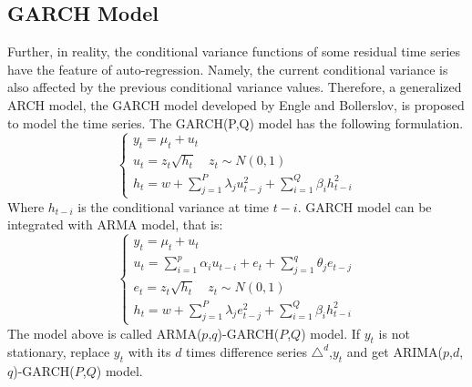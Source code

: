 \subsection{GARCH Model}
\vspace{-0.05in}
Further, in reality, the conditional variance functions of some residual time series have the feature of auto-regression. Namely, the current conditional variance is also affected by the previous conditional variance values. Therefore, a generalized ARCH model, the GARCH model developed by Engle and Bollerslov, is  proposed to model the time series. The GARCH(P,Q) model has the following formulation.
\begin{equation}
    \begin{cases}
      y_t = \mu_t + u_t \\
      u_t = z_t{\sqrt{h_t}}\quad z_t\sim N(0,1)\\
      h_t = w+\sum_{j=1}^{P} {\lambda_j{u_{t-j}^2}}+\sum_{i=1}^{Q}{\beta_i{h_{t-i}^2}}
    \end{cases}
\end{equation}
Where $h_{t-i}$ is the conditional variance at time $t-i$.
GARCH model can be integrated with ARMA model, that is:
\begin{equation}
    \begin{cases}
      y_t = \mu_t + u_t \\
     u_t = \sum_{i=1}^{p} {\alpha_i{u_{t-i}}} + e_t+ \sum_{j=1}^{q} {\theta_j{e_{t-j}}}\\
     e_t = z_t{\sqrt{h_t}} \quad  z_t\sim N(0,1)\\
      h_t = w+\sum_{j=1}^{P} {\lambda_j{e_{t-j}^2}}+\sum_{i=1}^{Q}{\beta_i{h_{t-i}^2}}
    \end{cases}
\end{equation}
The model above is called ARMA($p$,$q$)-GARCH($P$,$Q$) model. If $y_t$ is not stationary, replace $y_t$ with its $d$ times difference series $\triangle^d$,$y_t$ and get ARIMA($p$,$d$,$q$)-GARCH($P$,$Q$) model.



